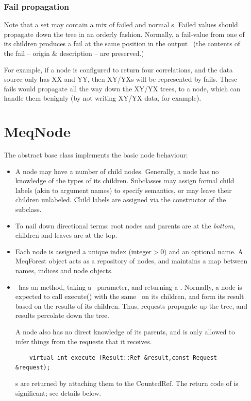 \documentclass[10pt,twoside]{book}
\begin{document}
\subsection{Fail propagation}

  Note that a set may contain a mix of failed and normal \VellSet{}s. Failed
  values should propagate down the tree in an orderly fashion. Normally, a
  fail-value from one of its children produces a fail at the same position in
  the output \Result\ (the contents of the fail -- origin \& description -- are
  preserved.)

  For example, if a  node is configured to return four correlations,
  and the data source only has XX and YY, then XY/YXs will be represented by
  fails. These fails would propagate all the way down the XY/YX trees, to a
   node, which can handle them benignly (by not writing XY/YX data,
  for example).

\chapter{MeqNode}

  The abstract base class  implements the basic node behaviour:

  \begin{itemize}

  \item A node may have a number of child nodes. Generally, a node has no
    knowledge of the types of its children. Subclasses may assign formal child
    labels (akin to argument names) to specify semantics, or may leave their
    children unlabeled. Child labels are assigned via the constructor of the
    subclass.

  \item To nail down directional terms: root nodes and parents are at the {\em
    bottom}, children and leaves are at the top. 

  \item Each node is assigned a unique index (integer$>$0) and an optional name. A
    MeqForest object acts as a repository of nodes, and maintains a map between
    names, indices and node objects.

  \item \Node\ has an  method, taking a \Request\ parameter,
    and returning a \Result. Normally, a node is expected to call execute()
    with the same \Request\ on its children, and form its result based on the
    results of its children. Thus, requests propagate up the tree, and results
    percolate down the tree.
    
A node also has no direct knowledge of its parents, and is only allowed to
infer things from the requests that it receives.


\begin{verbatim}
    virtual int execute (Result::Ref &result,const Request &request);
\end{verbatim}

    \Result{}s are returned by attaching them to the CountedRef. The return code
    of  is significant; see details below.

  \end{itemize}
\end{document}
